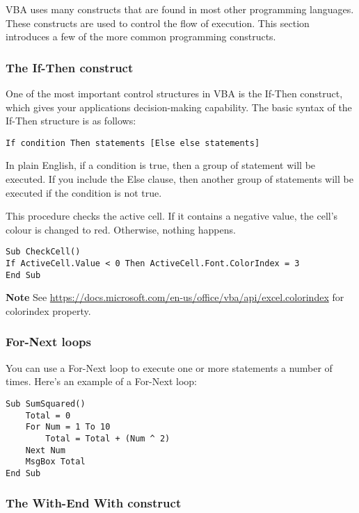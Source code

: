 \documentclass[
]{article}
\theoremstyle{definition}
\theoremstyle{definition}
\theoremstyle{definition}
\theoremstyle{definition}
\theoremstyle{remark}
\begin{document}
VBA uses many constructs that are found in most other programming
languages. These constructs are used to control the flow of execution.
This section introduces a few of the more common programming constructs.

\hypertarget{the-if-then-construct}{%
\subsubsection{The If-Then construct}\label{the-if-then-construct}}

One of the most important control structures in VBA is the If-Then construct, which gives your applications decision-making capability. The
basic syntax of the If-Then structure is as follows:

\begin{verbatim}
If condition Then statements [Else else statements]
\end{verbatim}

In plain English, if a condition is true, then a group of statement will
be executed. If you include the Else clause, then another group of
statements will be executed if the condition is not true.

This procedure checks the active cell. If it contains a negative value,
the cell's colour is changed to red. Otherwise, nothing happens.

\begin{verbatim}
Sub CheckCell()
If ActiveCell.Value < 0 Then ActiveCell.Font.ColorIndex = 3
End Sub
\end{verbatim}

\textbf{Note} See
\url{https://docs.microsoft.com/en-us/office/vba/api/excel.colorindex} for colorindex property.

\hypertarget{for-next-loops}{%
\subsubsection{For-Next loops}\label{for-next-loops}}

You can use a For-Next loop to execute one or more statements a number of times. Here's an example of a For-Next loop:

\begin{verbatim}
Sub SumSquared()
    Total = 0
    For Num = 1 To 10
        Total = Total + (Num ^ 2)
    Next Num
    MsgBox Total
End Sub
\end{verbatim}

\hypertarget{the-with-end-with-construct}{%
\subsubsection{The With-End With construct}\label{the-with-end-with-construct}}
\end{document}
